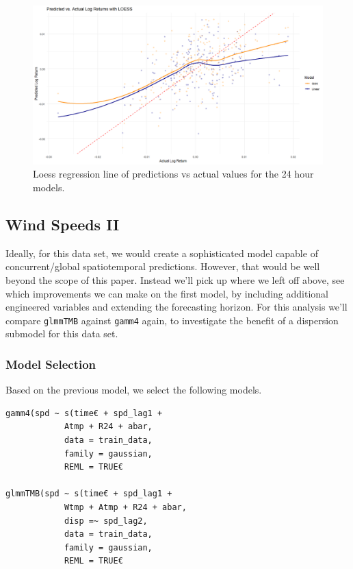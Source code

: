 \documentclass[12pt, twoside,hidelinks]{article}
\theoremstyle{definition}
\numberwithin{equation}{section}
\begin{document}
\begin{figure}[H]
    \includegraphics[width=\linewidth]{visuals/log_return/lr2_loess_bige_and_wide.png}
    \caption{Loess regression line of predictions vs actual values for the 24 hour models.}
    \label{log_return_alt_loess}
    \label{results:log_return_alt}
\end{figure}



\subsection{Wind Speeds II}\label{sec:analysis:storm_count}

Ideally, for this data set, we would create a sophisticated model capable of concurrent/global spatiotemporal predictions. However, that would be well beyond the scope of this paper. Instead we'll pick up where we left off above, see which improvements we can make on the first model, by including additional engineered variables and extending the forecasting horizon. For this analysis we'll compare \texttt{glmmTMB} against \texttt{gamm4} again, to investigate the benefit of a dispersion submodel for this data set. 

\subsubsection{Model Selection}

Based on the previous model, we select the following models. 

\begin{lstlisting}
gamm4(spd ~ s(time€ + spd_lag1 + 
            Atmp + R24 + abar,
            data = train_data,
            family = gaussian,
            REML = TRUE€
   
glmmTMB(spd ~ s(time€ + spd_lag1 + 
            Wtmp + Atmp + R24 + abar,
            disp =~ spd_lag2,
            data = train_data,
            family = gaussian, 
            REML = TRUE€
\end{lstlisting}
\end{document}
